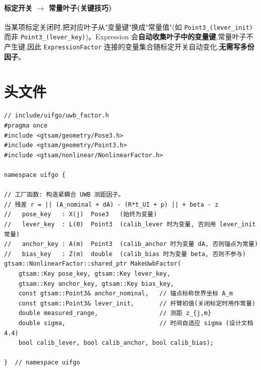 \documentclass[11pt,a4paper]{report}
\begin{document}
\paragraph{标定开关 $\to$ 常量叶子(关键技巧)}
当某项标定关闭时,把对应叶子从"变量键"换成"常量值"(如 \verb|Point3_(lever_init)| 而非 \verb|Point3_(lever_key)|)。Expression 会\textbf{自动收集叶子中的变量键},常量叶子不产生键,因此 \texttt{ExpressionFactor} 连接的变量集合随标定开关自动变化,\textbf{无需写多份因子}。

\section{头文件}
\begin{lstlisting}[style=cpp]
// include/uifgo/uwb_factor.h
#pragma once
#include <gtsam/geometry/Pose3.h>
#include <gtsam/geometry/Point3.h>
#include <gtsam/nonlinear/NonlinearFactor.h>

namespace uifgo {

// 工厂函数: 构造紧耦合 UWB 测距因子。
// 残差 r = || (A_nominal + dA) - (R*t_UI + p) || + beta - z
//   pose_key   : X(j)  Pose3   (始终为变量)
//   lever_key  : L(0)  Point3  (calib_lever 时为变量, 否则用 lever_init 常量)
//   anchor_key : A(m)  Point3  (calib_anchor 时为变量 dA, 否则锚点为常量)
//   bias_key   : Z(m)  double  (calib_bias 时为变量 beta, 否则不参与)
gtsam::NonlinearFactor::shared_ptr MakeUwbFactor(
    gtsam::Key pose_key, gtsam::Key lever_key,
    gtsam::Key anchor_key, gtsam::Key bias_key,
    const gtsam::Point3& anchor_nominal,   // 锚点标称世界坐标 A_m
    const gtsam::Point3& lever_init,       // 杆臂初值(关闭标定时用作常量)
    double measured_range,                 // 测距 z_{j,m}
    double sigma,                          // 时间自适应 sigma (设计文档 4.4)
    bool calib_lever, bool calib_anchor, bool calib_bias);

}  // namespace uifgo
\end{lstlisting}
\end{document}
